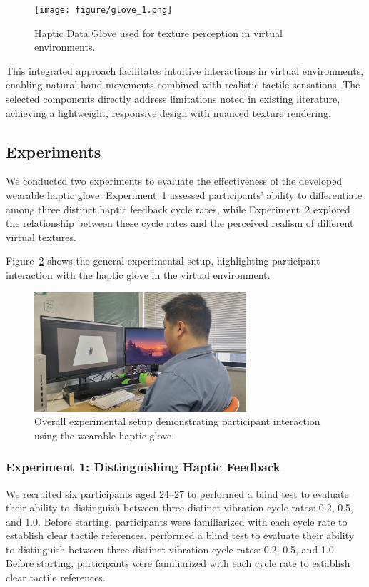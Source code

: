 \documentclass[graybox]{svmult}
\begin{document}
\begin{figure}\centering
	\texttt{[image: figure/glove\_1.png]}%
	\caption{Haptic Data Glove used for texture perception in virtual environments.}\label{fig:glove_1}
\end{figure}

This integrated approach facilitates intuitive interactions in virtual environments, enabling natural hand movements combined with realistic tactile sensations. The selected components directly address limitations noted in existing literature, achieving a lightweight, responsive design with nuanced texture rendering.

\subsection{Experiments}\label{sec:Experiments}
We conducted two experiments to evaluate the effectiveness of the developed wearable haptic glove. Experiment~1 assessed participants' ability to differentiate among three distinct haptic feedback cycle rates, while Experiment~2 explored the relationship between these cycle rates and the perceived realism of different virtual textures.

Figure~\ref{fig:experiment_setup} shows the general experimental setup, highlighting participant interaction with the haptic glove in the virtual environment.

\begin{figure}\centering
	\includegraphics[width=0.7\textwidth]{figure/experiment.png}%
	\caption{Overall experimental setup demonstrating participant interaction using the wearable haptic glove.}\label{fig:experiment_setup}
\end{figure}

\subsubsection{Experiment 1: Distinguishing Haptic Feedback}
We recruited six participants aged 24–27 to performed a blind test to evaluate their ability to distinguish between three distinct vibration cycle rates: 0.2, 0.5, and 1.0. Before starting, participants were familiarized with each cycle rate to establish clear tactile references.
performed a blind test to evaluate their ability to distinguish between three distinct vibration cycle rates: 0.2, 0.5, and 1.0. Before starting, participants were familiarized with each cycle rate to establish clear tactile references.
\end{document}
